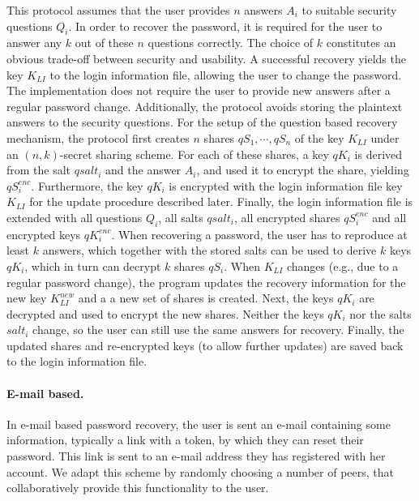  This protocol assumes that the user provides $n$ answers $A_i$ to suitable
 security questions $Q_i$. In order to recover the password, it is
 required for the user to answer any $k$ out of these $n$ questions
 correctly. The choice of $k$ constitutes an obvious trade-off
 between security and usability. A successful recovery yields
 the key $K_{LI}$ to the login information file, allowing the user to
change the password. The implementation
does not require the user to provide new answers after a regular
 password change. Additionally, the protocol avoids storing the plaintext
 answers to the security questions.
 For the setup of the question based recovery mechanism, the protocol first
creates $n$ shares $qS_1, \cdots, qS_n$ of the
 key $K_{LI}$ under an $(n, k)$-secret sharing scheme. For each of
 these shares, a key $qK_i$ is derived from the salt $qsalt_i$ and the answer
$A_i$, and used it to encrypt the share,
 yielding $qS^{enc}_i$. Furthermore, the key $qK_i$ is encrypted with
 the login information file key $K_{LI}$ for the update procedure
 described later. Finally, the login information file is extended
 with all questions $Q_i$, all salts $qsalt_i$, all encrypted shares
 $qS_i^{enc}$ and all encrypted keys $qK_i^{enc}$. When recovering a password, the
 user has to reproduce at least $k$ answers, which together with
 the stored salts can be used to derive $k$ keys $qK_i$, which in
 turn can decrypt $k$ shares $qS_i$.
 When $K_{LI}$ changes (e.g., due to a regular password
 change), the program updates the recovery information %
 for the new key $K_{LI}^{new}$ and a a new set of shares is created.
 Next, the keys $qK_i$ are decrypted and used to encrypt the new
 shares. Neither the keys $qK_i$ nor the salts $salt_i$ change, so
 the user can still use the same answers for recovery. Finally,
 the updated shares and re-encrypted keys (to allow further
 updates) are saved back to the login information file.

\paragraph{E-mail based.}

  In e-mail based password recovery, the user is sent an e-mail
 containing some information, typically a link with a token, by
 which they can reset their password. This link is sent to an e-mail
 address they has registered with her account.
 We adapt this scheme by randomly choosing a number of
 peers, that collaboratively provide this functionality to the user.
 

